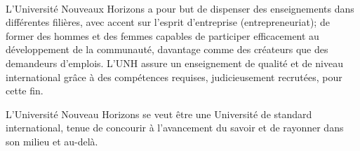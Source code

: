 \begingroup

\paragraph{}
L'Université Nouveaux Horizons a pour but de dispenser des enseignements dans différentes filières, avec accent sur l'esprit d'entreprise (entrepreneuriat); de former des hommes et des femmes capables de participer efficacement au développement de la communauté, davantage comme des créateurs que des demandeurs d'emplois.
L'UNH assure un enseignement de qualité et de niveau international grâce à des compétences requises, judicieusement recrutées, pour cette fin.


L'Université Nouveau Horizons se veut être une Université de standard international, tenue de concourir à l'avancement du savoir et de rayonner dans son milieu et au-delà.

\endgroup